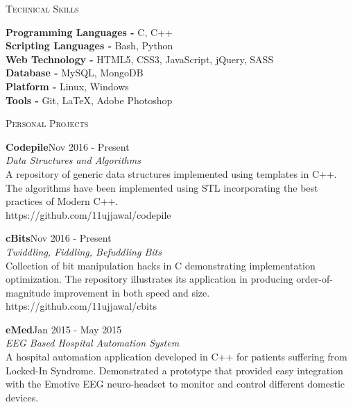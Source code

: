 \documentclass[a4paper, 11pt]{article}
\begin{document}
\begin{minipage}[t]{0.15\textwidth}
	\small \textsc{Technical Skills}
\end{minipage}
\hfill
\begin{minipage}[t]{0.80\textwidth}
	\noindent \textbf{Programming Languages - }C, C++\\
	\noindent \textbf{Scripting Languages - }Bash, Python\\
	\noindent \textbf{Web Technology - }HTML5, CSS3, JavaScript, jQuery, SASS\\
	\noindent \textbf{Database - }MySQL, MongoDB\\
	\noindent \textbf{Platform - }Linux, Windows\\
	\noindent \textbf{Tools - }Git, \LaTeX, Adobe Photoshop
	
\end{minipage}

\vspace{5mm}

\begin{minipage}[t]{0.15\textwidth}
	\small \textsc{Personal Projects}
\end{minipage}
\hfill
\begin{minipage}[t]{0.80\textwidth}
	\noindent \textbf{Codepile}\hfill {\scriptsize \textrm{Nov 2016 - Present}}\\
	{
	\small \textit{Data Structures and Algorithms}\\
	A repository of generic data structures implemented using templates in C++. The algorithms have been implemented using STL incorporating the best practices of Modern C++.\\
	\footnotesize https://github.com/11ujjawal/codepile\\
	}
	
	{
	\noindent \textbf{cBits}\hfill {\scriptsize \textrm{Nov 2016 - Present}}\\
	\small \textit{Twiddling, Fiddling, Befuddling Bits}\\
	Collection of bit manipulation hacks in C demonstrating implementation optimization. The repository illustrates its application in producing order-of-magnitude improvement in both speed and size.\\
	\footnotesize https://github.com/11ujjawal/cbits\\
	}
	
	\noindent \textbf{eMed}\hfill {\scriptsize \textrm{Jan 2015 - May 2015}}\\
	\small \textit{ EEG Based Hospital Automation System}\\
	A hospital automation application developed in C++ for patients suffering from Locked-In Syndrome. Demonstrated a prototype that provided easy integration with the Emotive EEG neuro-headset to monitor and control different domestic devices.
	
\end{minipage}
\end{document}
